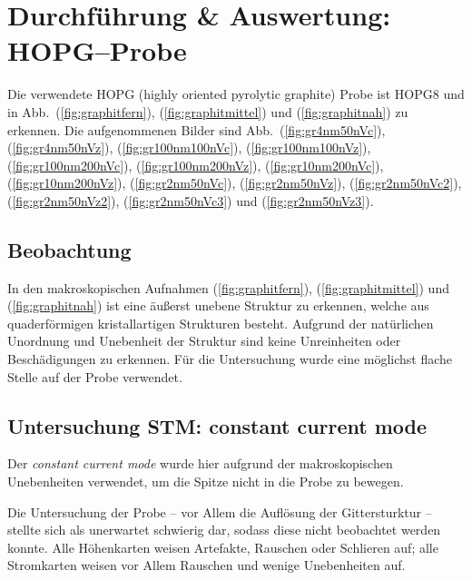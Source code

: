 \documentclass[sn-mathphys-num,iicol]{sn-jnl}
\theoremstyle{thmstyleone}
\theoremstyle{thmstyletwo}
\theoremstyle{thmstylethree}
\begin{document}
\section{Durchführung \& Auswertung:\\HOPG--Probe}
Die verwendete HOPG (highly oriented pyrolytic graphite) Probe ist \glqq HOPG8\grqq{} und in Abb.\ (\ref{fig:graphitfern}), (\ref{fig:graphitmittel}) und (\ref{fig:graphitnah}) zu erkennen.
Die aufgenommenen Bilder sind Abb.\ (\ref{fig:gr4nm50nVc}), (\ref{fig:gr4nm50nVz}), (\ref{fig:gr100nm100nVc}), (\ref{fig:gr100nm100nVz}), (\ref{fig:gr100nm200nVc}), (\ref{fig:gr100nm200nVz}), (\ref{fig:gr10nm200nVc}), (\ref{fig:gr10nm200nVz}), (\ref{fig:gr2nm50nVc}), (\ref{fig:gr2nm50nVz}), (\ref{fig:gr2nm50nVc2}), (\ref{fig:gr2nm50nVz2}), (\ref{fig:gr2nm50nVc3}) und (\ref{fig:gr2nm50nVz3}).

\subsection{Beobachtung}
In den makroskopischen Aufnahmen (\ref{fig:graphitfern}), (\ref{fig:graphitmittel}) und (\ref{fig:graphitnah}) ist eine äußerst unebene Struktur zu erkennen, welche aus quaderförmigen kristallartigen Strukturen besteht. %
Aufgrund der natürlichen Unordnung und Unebenheit der Struktur sind keine Unreinheiten oder Beschädigungen zu erkennen.
Für die Untersuchung wurde eine möglichst flache Stelle auf der Probe verwendet.

\subsection{Untersuchung STM: constant current mode}
Der \textit{constant current mode} wurde hier aufgrund der makroskopischen Unebenheiten verwendet, um die Spitze nicht in die Probe zu bewegen.

Die Untersuchung der Probe -- vor Allem die Auflösung der Gittersturktur -- stellte sich als unerwartet schwierig dar, sodass diese nicht beobachtet werden konnte.
Alle Höhenkarten weisen Artefakte, Rauschen oder Schlieren auf; alle Stromkarten weisen vor Allem Rauschen und wenige Unebenheiten auf.
\end{document}
